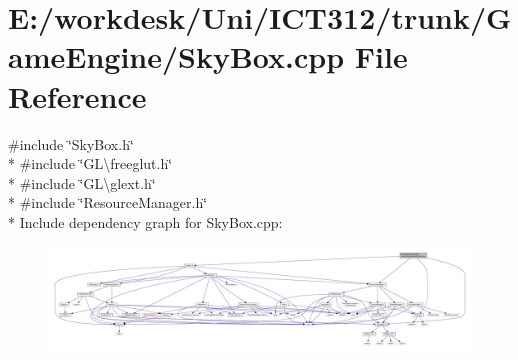\section{E\+:/workdesk/\+Uni/\+I\+C\+T312/trunk/\+Game\+Engine/\+Sky\+Box.cpp File Reference}
\label{_sky_box_8cpp}
{\ttfamily \#include \char`\"{}Sky\+Box.\+h\char`\"{}}\\*
{\ttfamily \#include \char`\"{}G\+L\textbackslash{}freeglut.\+h\char`\"{}}\\*
{\ttfamily \#include \char`\"{}G\+L\textbackslash{}glext.\+h\char`\"{}}\\*
{\ttfamily \#include \char`\"{}Resource\+Manager.\+h\char`\"{}}\\*
Include dependency graph for Sky\+Box.\+cpp\+:\nopagebreak
\begin{figure}[H]
\begin{center}
\leavevmode
\includegraphics[width=350pt]{d3/d6b/_sky_box_8cpp__incl}
\end{center}
\end{figure}
